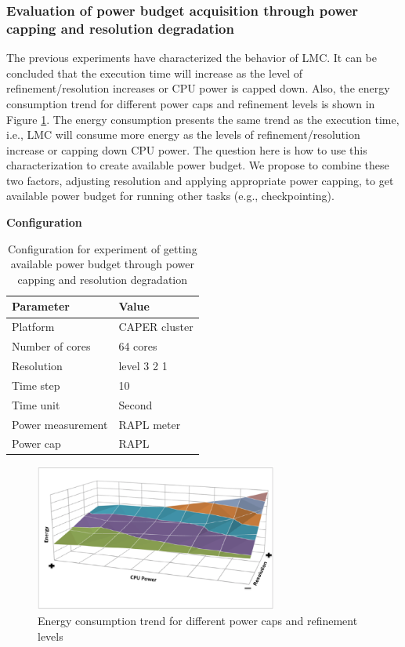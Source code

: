 \documentclass[10pt, conference, compsocconf]{IEEEtran}
\begin{document}
\subsubsection{Evaluation of power budget acquisition through power capping and resolution degradation}
The previous experiments have characterized the behavior of LMC. It can be concluded that the execution time will increase as the level of refinement/resolution increases or CPU power is capped down. Also, the energy consumption trend for different power caps and refinement levels is shown in Figure \ref{fig:Energy_consumption_trend}. The energy consumption presents the same trend as the execution time, i.e., LMC will consume more energy as the levels of refinement/resolution increase or capping down CPU power. The question here is how to use this characterization to create available power budget. We propose to combine these two factors, adjusting resolution and applying appropriate power capping, to get available power budget for running other tasks (e.g., checkpointing). 


\textbf{Configuration}
\begin{table}[H]
\begin{center}
\begin{tabular}{|l|l|}
	\hline
	\textbf{Parameter} & \textbf{Value}\\ \hline
    Platform & CAPER cluster\\ 		\hline
    Number of cores & 64 cores\\
	\hline
	Resolution & level 3 2 1\\
    \hline
    Time step & 10\\
    \hline
    Time unit & Second\\
    \hline
    Power measurement & RAPL meter\\
    \hline
    Power cap & RAPL\\
    \hline
\end{tabular}
\end{center}
\caption{Configuration for experiment of getting available power budget through power capping and resolution degradation
}
\label{table:table_tradeoff}
\end{table}



\begin{figure}[H]
	\centering
    \includegraphics[width=8cm]{figs/Energy_consumption_trend.png}
        \caption{Energy consumption trend for different power caps and refinement levels}
        \label{fig:Energy_consumption_trend}
\end{figure}
\end{document}
